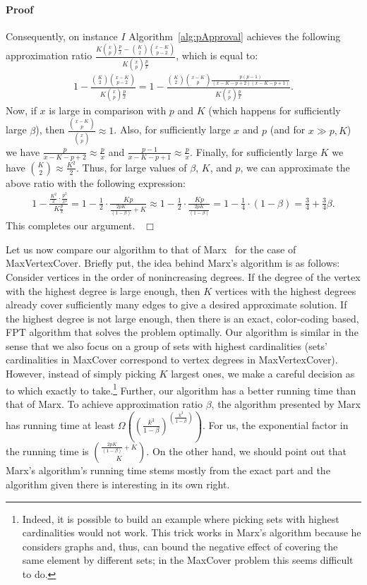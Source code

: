 \documentclass[11pt]{article}
\newenvironment{proof}{\paragraph{Proof}}{\hfill$\Box$\medskip}
\begin{document}
\begin{proof}
  Consequently, on instance $I$ Algorithm~\ref{alg:pApproval} achieves
  the following approximation ratio $\frac{K{x \choose p} \frac{p}{x}
    - {K \choose 2}{x-K \choose p-2}}{K{x \choose p} \frac{p}{x}}$,
  which is equal to:
  \begin{align*}
    1 - \frac{{K \choose 2}{x-K \choose p-2}}{K{x \choose p}
      \frac{p}{x}}
  =  1 - \frac{{K \choose 2}{x -K \choose p}
      \frac{p(p-1)}{(x-K-p+2)(x-K-p+1)}}{K{x \choose p} \frac{p}{x}}
    \textrm{.}
  \end{align*}
  Now, if $x$ is large in comparison with $p$ and $K$ (which happens
  for sufficiently large $\beta$), then $\frac{{x -K \choose p}}{{x
      \choose p}} \approx 1$. Also, for sufficiently large $x$ and $p$
  (and for $x \gg p, K$) we have $\frac{p}{x-K-p+2} \approx
  \frac{p}{x}$ and $\frac{p-1}{x-K-p+1} \approx \frac{p}{x}$. Finally,
  for sufficiently large $K$ we have ${K \choose 2} \approx
  \frac{K^2}{2}$. Thus, for large values of $\beta$, $K$, and $p$, we
  can approximate the above ratio with the following expression:
  \begin{align*}
    1 - \frac{\frac{K^2}{2} \cdot \frac{p^2}{x^2}}{K\frac{p}{x}} = 1 - \frac{1}{2} \cdot \frac{Kp}{\frac{2p K}{(1 - \beta)} + K} \approx 
    1 - \frac{1}{2} \cdot \frac{Kp}{\frac{2p K}{(1 - \beta)}} = 1 -
    \frac{1}{4} \cdot(1 - \beta) = \frac{3}{4} + \frac{3}{4}\beta
    \textrm{.}
  \end{align*}
This completes our argument.~
\end{proof}


Let us now compare our algorithm to that of
Marx~\cite{Marx06parameterizedcomplexity} for the case of MaxVertexCover.
Briefly put, the idea behind Marx's algorithm is as follows: Consider
vertices in the order of nonincreasing degrees. If the degree of the
vertex with the highest degree is large enough, then $K$ vertices with
the highest degrees already cover sufficiently many edges to give a
desired approximate solution. If the 
highest degree is not large enough, then there is an exact,
color-coding based, FPT algorithm that solves the problem
optimally. Our algorithm is similar in the sense that we also focus on
a group of sets with highest cardinalities (sets' cardinalities in
MaxCover correspond to vertex degrees in MaxVertexCover). However,
instead of simply picking $K$ largest ones, we make a careful decision
as to which exactly to take.\footnote{Indeed, it is possible to build
  an example where picking sets with highest cardinalities would not
  work. This trick works in Marx's algorithm because he considers
  graphs and, thus, can bound the negative effect of covering the same
  element by different sets; in the MaxCover problem this seems
  difficult to do.}
Further, our algorithm has a better running time than that of Marx.
To achieve approximation ratio $\beta$, the algorithm presented by
Marx has running time at least
$\Omega((\frac{k^3}{1-\beta})^{(\frac{k^3}{1-\beta})})$. For us, the
exponential factor in the running time is ${\frac{2p K}{(1 - \beta)} +
  K \choose K}$. On the other hand, we should point out that Marx's
algorithm's running time stems mostly from the exact part and the
algorithm given there is interesting in its own right.
\end{document}
